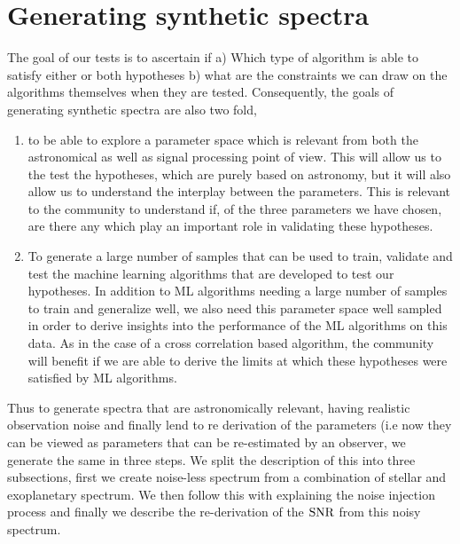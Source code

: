 \section{Generating synthetic spectra}
The goal of our tests is to ascertain if a) Which type of algorithm is able to satisfy either or both hypotheses b) what are the constraints we can draw on the algorithms themselves when they are tested.
Consequently, the goals of generating synthetic spectra are also two fold, 
\begin{enumerate}
    \item to be able to explore a parameter space which is relevant from both the astronomical as well as signal processing point of view.
    This will allow us to the test the hypotheses, which are purely based on astronomy, but it will also allow us to understand the interplay between the parameters.
    This is relevant to the community to understand if, of the three parameters we have chosen, are there any which play an important role in validating these hypotheses.
    \item To generate a large number of samples that can be used to train, validate and test the machine learning algorithms that are developed to test our hypotheses.
    In addition to ML algorithms needing a large number of samples to train and generalize well, we also need this parameter space well sampled in order to derive insights into the performance of the ML algorithms on this data.
    As in the case of a cross correlation based algorithm, the community will benefit if we are able to derive the limits at which these hypotheses were satisfied by ML algorithms.
\end{enumerate}
Thus to generate spectra that are astronomically relevant, having realistic observation noise and finally lend to re derivation of the parameters (i.e now they can be viewed as parameters that can be re-estimated by an observer, we generate the same in three steps.
We split the description of this into three subsections, first we create noise-less spectrum from a combination of stellar and exoplanetary spectrum.
We then follow this with explaining the noise injection process and finally we describe the re-derivation of the $\rm{SNR}$ from this noisy spectrum.

